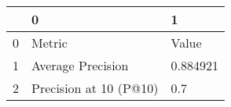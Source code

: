 \begin{tabular}{lll}
\toprule
{} &                       0 &         1 \\
\midrule
0 &                  Metric &     Value \\
1 &       Average Precision &  0.884921 \\
2 &  Precision at 10 (P@10) &       0.7 \\
\bottomrule
\end{tabular}
